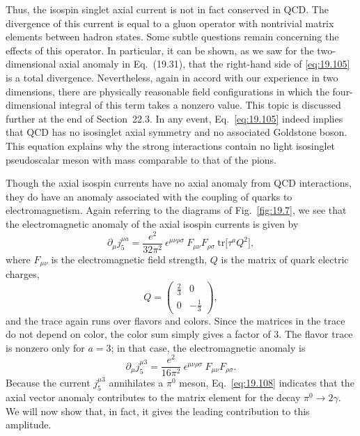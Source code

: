 Thus, the isospin singlet axial current is not in fact conserved in QCD.  The
divergence of this current is equal to a gluon operator with nontrivial matrix
elements between hadron states.  Some subtle questions remain concerning the
effects of this operator.  In particular, it can be shown, as we saw for the
two-dimensional axial anomaly in Eq.~(19.31), that the right-hand
side of \eqref{eq:19.105} is a total divergence.  Nevertheless, again in
accord with our experience in two dimensions, there are physically reasonable
field configurations in which the four-dimensional integral of this term
takes a nonzero value.  This topic is discussed further at the end of
Section~22.3.  In any event, Eq.~\eqref{eq:19.105} indeed implies that QCD
has no isosinglet axial symmetry and no associated Goldstone boson.  This
equation explains why the strong interactions contain no light isosinglet
pseudoscalar meson with mass comparable to that of the pions.

Though the axial isospin currents have no axial anomaly from QCD
interactions, they do have an anomaly associated with the coupling of quarks
to electromagnetism.  Again referring to the diagrams of Fig.~\ref{fig:19.7},
we see that the electromagnetic anomaly of the axial isospin currents is given
by
\begin{equation}
  \partial_\mu j^{\mu a}_5 = \frac{e^2}{32\pi^2}\ \epsilon^{\mu\nu\rho\sigma}\
    F_{\mu\nu}F_{\rho\sigma}\ \mathrm{tr}\bigl[ \tau^a Q^2 \bigr] ,
  \label{eq:19.106}
\end{equation}
where $F_{\mu\nu}$ is the electromagnetic field strength, $Q$ is the matrix
of quark electric charges,
\begin{equation}
  Q = \begin{pmatrix}\frac{2}{3}&0\\ 0&-\frac{1}{3}\end{pmatrix},
  \label{eq:19.107}
\end{equation}
and the trace again runs over flavors and colors.  Since the matrices in the
trace do not depend on color, the color sum simply gives a factor of 3.  The
flavor trace is nonzero only for $a = 3$; in that case, the electromagnetic
anomaly is
\begin{equation}
  \partial_\mu j^{\mu 3}_5 = \frac{e^2}{16\pi^2}\ \epsilon^{\mu\nu\rho\sigma}\
    F_{\mu\nu}F_{\rho\sigma} .
  \label{eq:19.108}
\end{equation}
Because the current $j^{\mu 3}_5$ annihilates a $\pi^0$ meson, Eq.~\eqref{eq:19.108}
indicates that the axial vector anomaly contributes to the matrix element for
the decay $\pi^0\to 2\gamma$.  We will now show that, in fact, it gives the
leading contribution to this amplitude.

